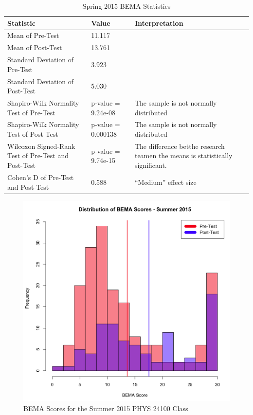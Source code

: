 \pagebreak

\begin{landscape}
\begin{table}[!ht]
  \centering
  \begin{tabular}{|l|l|l|}
    \hline
    \textbf{Statistic} & \textbf{Value} & \textbf{Interpretation}\\
	\hline
	Mean of Pre-Test & 11.117 & \\
	\hline
	Mean of Post-Test & 13.761 & \\
	\hline
	Standard Deviation of Pre-Test & 3.923 & \\
	\hline
	Standard Deviation of Post-Test & 5.030 & \\
	\hline
	Shapiro-Wilk Normality Test of Pre-Test & p-value = 9.24e-08 & The sample is not normally distributed \\
	\hline
	Shapiro-Wilk Normality Test of Post-Test & p-value = 0.000138 & The sample is not normally distributed \\
	\hline
	Wilcoxon Signed-Rank Test of Pre-Test and Post-Test & p-value = 9.74e-15 & The difference betthe research teamen the means is statistically significant. \\
	\hline
	Cohen's D of Pre-Test and Post-Test & 0.588 & ``Medium'' effect size \\
	\hline
  \end{tabular}
  \caption{Spring 2015 BEMA Statistics}
  \label{tab:statsSp15}
\end{table}
\end{landscape}

\begin{figure}[!htb]
	\centering
	\includegraphics[width=6in]{img/chapter4/bema_summer_2015}
	\caption[BEMA Scores for the Summer 2015 PHYS 24100 Class]{BEMA Scores for the Summer 2015 PHYS 24100 Class}
  \label{fig:bemaSu15}
\end{figure}

